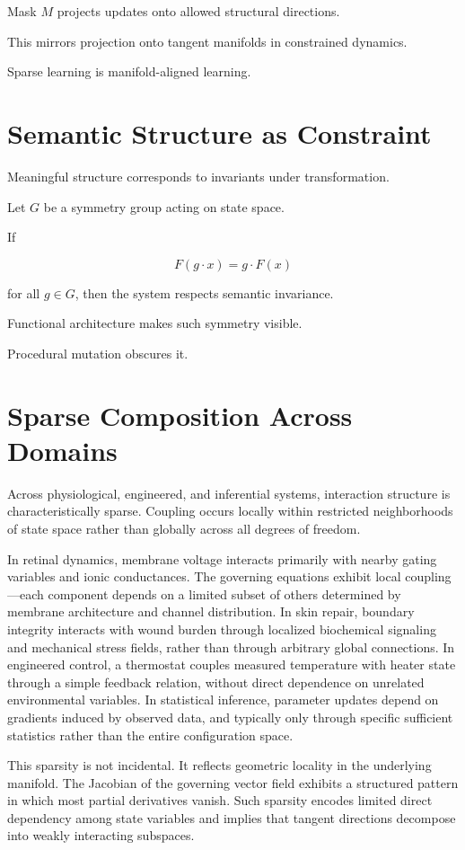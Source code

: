 \documentclass[12pt]{book}
\begin{document}
Mask $M$ projects updates onto allowed structural directions.

This mirrors projection onto tangent manifolds in constrained dynamics.

Sparse learning is manifold-aligned learning.

\section{Semantic Structure as Constraint}

Meaningful structure corresponds to invariants under transformation.

Let $G$ be a symmetry group acting on state space.

If

\[
F(g \cdot x) = g \cdot F(x)
\]

for all $g \in G$, then the system respects semantic invariance.

Functional architecture makes such symmetry visible.

Procedural mutation obscures it.
\section{Sparse Composition Across Domains}

Across physiological, engineered, and inferential systems, interaction structure is characteristically sparse. Coupling occurs locally within restricted neighborhoods of state space rather than globally across all degrees of freedom.

In retinal dynamics, membrane voltage interacts primarily with nearby gating variables and ionic conductances. The governing equations exhibit local coupling---each component depends on a limited subset of others determined by membrane architecture and channel distribution. In skin repair, boundary integrity interacts with wound burden through localized biochemical signaling and mechanical stress fields, rather than through arbitrary global connections. In engineered control, a thermostat couples measured temperature with heater state through a simple feedback relation, without direct dependence on unrelated environmental variables. In statistical inference, parameter updates depend on gradients induced by observed data, and typically only through specific sufficient statistics rather than the entire configuration space.

This sparsity is not incidental. It reflects geometric locality in the underlying manifold. The Jacobian of the governing vector field exhibits a structured pattern in which most partial derivatives vanish. Such sparsity encodes limited direct dependency among state variables and implies that tangent directions decompose into weakly interacting subspaces.
\end{document}
